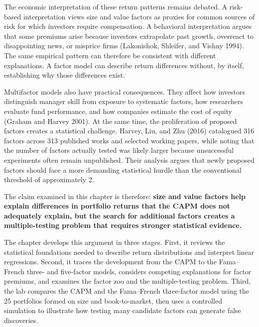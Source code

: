 The economic interpretation of these return patterns remains debated. A risk-based interpretation views size and value factors as proxies for common sources of risk for which investors require compensation. A behavioral interpretation argues that some premiums arise because investors extrapolate past growth, overreact to disappointing news, or misprice firms (Lakonishok, Shleifer, and Vishny 1994). The same empirical pattern can therefore be consistent with different explanations. A factor model can describe return differences without, by itself, establishing why those differences exist.

Multifactor models also have practical consequences. They affect how investors distinguish manager skill from exposure to systematic factors, how researchers evaluate fund performance, and how companies estimate the cost of equity (Graham and Harvey 2001). At the same time, the proliferation of proposed factors creates a statistical challenge. Harvey, Liu, and Zhu (2016) catalogued 316 factors across 313 published works and selected working papers, while noting that the number of factors actually tested was likely larger because unsuccessful experiments often remain unpublished. Their analysis argues that newly proposed factors should face a more demanding statistical hurdle than the conventional threshold of approximately 2.

The claim examined in this chapter is therefore: \textbf{size and value factors help explain differences in portfolio returns that the CAPM does not adequately explain, but the search for additional factors creates a multiple-testing problem that requires stronger statistical evidence.}

The chapter develops this argument in three stages. First, it reviews the statistical foundations needed to describe return distributions and interpret linear regressions. Second, it traces the development from the CAPM to the Fama--French three- and five-factor models, considers competing explanations for factor premiums, and examines the factor zoo and the multiple-testing problem. Third, the lab compares the CAPM and the Fama--French three-factor model using the 25 portfolios formed on size and book-to-market, then uses a controlled simulation to illustrate how testing many candidate factors can generate false discoveries.

